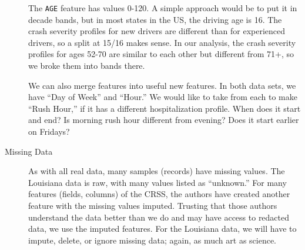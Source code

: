 \begin{description}
The \verb|AGE| feature has values 0-120.   A simple approach would be to put it in decade bands, but in most states in the US, the driving age is 16.  The crash severity profiles for new drivers are different than for experienced drivers, so a split at 15/16 makes sense.  In our analysis, the crash severity profiles for ages 52-70 are similar to each other but different from 71+, so we broke them into bands there.  
	
We can also merge features into useful new features.  In both data sets, we have ``Day of Week'' and ``Hour.''  We would like to take from each to make ``Rush Hour,'' if it has a different hospitalization profile.  When does it start and end?  Is morning rush hour different from evening?  Does it start earlier on Fridays?  
	
	\item [Missing Data]  As with all real data, many samples (records) have missing values.  The Louisiana data is raw, with many values listed as ``unknown.'' For many features (fields, columns) of the CRSS, the authors have created another feature with the missing values imputed.  Trusting that those authors understand the data better than we do and may have access to redacted data, we use the imputed features.  For the Louisiana data, we will have to impute, delete, or ignore missing data; again, as much art as science.  

	
\end{description}


